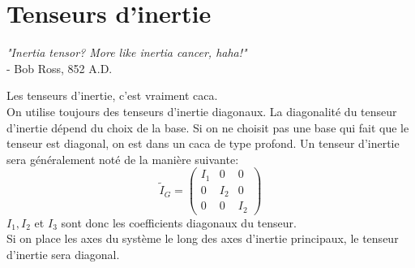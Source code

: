 \documentclass{article}
\numberwithin{equation}{section}
\begin{document}
\section{Tenseurs d'inertie}
\begin{center}
	\emph{"Inertia tensor? More like inertia cancer, haha!"} \\ \qquad \qquad - Bob Ross, 852 A.D.
\end{center}
Les tenseurs d'inertie, c'est vraiment caca. \\
On utilise toujours des tenseurs d'inertie diagonaux. La diagonalité du tenseur d'inertie dépend du choix de la base. Si on ne choisit pas une base qui fait que le tenseur est diagonal, on est dans un caca de type profond. Un tenseur d'inertie sera généralement noté de la manière suivante:
\begin{equation}
\tilde{I}_G = \begin{pmatrix}
I_1 & 0 & 0 \\
0 & I_2 & 0 \\
0 & 0 & I_2
\end{pmatrix}
\end{equation}
\(I_1, I_2\) et \(I_3\) sont donc les coefficients diagonaux du tenseur. \\
Si on place les axes du système le long des axes d'inertie principaux, le tenseur d'inertie sera diagonal.
\end{document}
